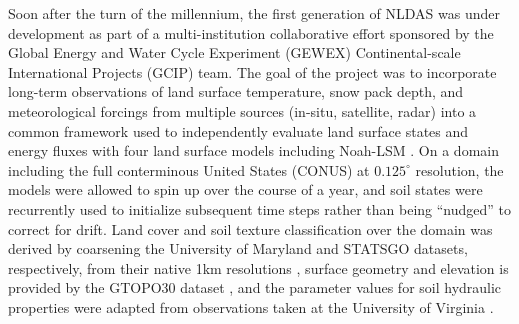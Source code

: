\documentclass[11pt]{article}
\begin{document}
\begin{multicols}{2}
    Soon after the turn of the millennium, the first generation of NLDAS was under development as part of a multi-institution collaborative effort sponsored by the Global Energy and Water Cycle Experiment (GEWEX) Continental-scale International Projects (GCIP) team. The goal of the project was to incorporate long-term observations of land surface temperature, snow pack depth, and meteorological forcings from multiple sources (in-situ, satellite, radar) into a common framework used to independently evaluate land surface states and energy fluxes with four land surface models including Noah-LSM \cite{mitchell_multi-institution_2004}. On a domain including the full conterminous United States (CONUS) at $0.125^\circ$ resolution, the models were allowed to spin up over the course of a year, and soil states were recurrently used to initialize subsequent time steps rather than being ``nudged'' to correct for drift. Land cover and soil texture classification over the domain was derived by coarsening the University of Maryland and STATSGO datasets, respectively, from their native 1km resolutions \cite{hansen_global_2000}, surface geometry and elevation is provided by the GTOPO30 dataset \cite{earth_resources_observation_and_science_centeru_s_geological_surveyu_s_department_of_the_interior_usgs_1997}, and the parameter values for soil hydraulic properties were adapted from observations taken at the University of Virginia \cite{cosby_statistical_1984}.

\end{multicols}
\end{document}
